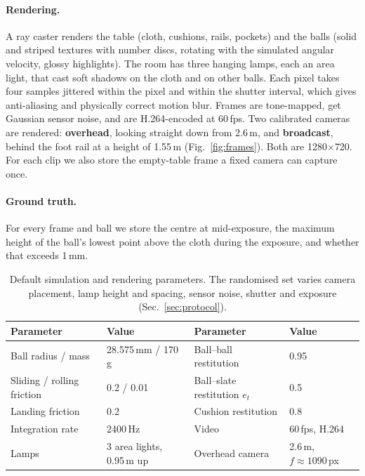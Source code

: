 \documentclass[11pt]{article}
\begin{document}
\paragraph{Rendering.}
A ray caster renders the table (cloth, cushions, rails, pockets) and the
balls (solid and striped textures with number discs, rotating with the
simulated angular velocity, glossy highlights). The room has three hanging lamps,
each an area light, that cast soft shadows on the cloth and on other balls.
Each pixel takes four samples jittered within the pixel and within the shutter
interval, which gives anti-aliasing and physically correct motion blur. Frames are
tone-mapped, get Gaussian sensor noise, and are H.264-encoded at 60\,fps. Two
calibrated cameras are rendered: \textbf{overhead}, looking straight down from
2.6\,m, and \textbf{broadcast}, behind the foot rail at a height of 1.55\,m
(Fig.~\ref{fig:frames}). Both are 1280$\times$720. For each clip we also store
the empty-table frame a fixed camera can capture once.

\paragraph{Ground truth.}
For every frame and ball we store the centre at mid-exposure, the maximum
height of the ball's lowest point above the cloth during the exposure, and
whether that exceeds 1\,mm.

\begin{table}[t]
\centering\small
\begin{tabular}{llll}
\toprule
Parameter & Value & Parameter & Value \\
\midrule
Ball radius / mass & 28.575\,mm / 170\,g & Ball--ball restitution & 0.95 \\
Sliding / rolling friction & 0.2 / 0.01 & Ball--slate restitution $e_t$ & 0.5 \\
Landing friction & 0.2 & Cushion restitution & 0.8 \\
Integration rate & 2400\,Hz & Video & 60\,fps, H.264 \\
Lamps & 3 area lights, 0.95\,m up & Overhead camera & 2.6\,m, $f\!\approx\!1090$\,px \\
\bottomrule
\end{tabular}
\caption{Default simulation and rendering parameters. The randomised set
varies camera placement, lamp height and spacing, sensor noise, shutter and
exposure (Sec.~\ref{sec:protocol}).}
\label{tab:params}
\end{table}
\end{document}
